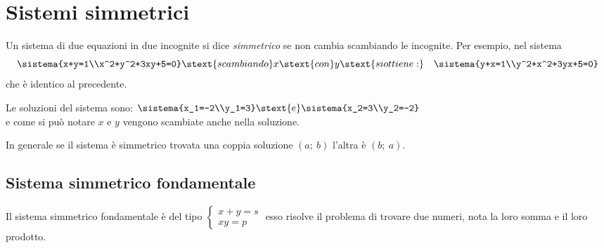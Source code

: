 % 
% 

\section{Sistemi simmetrici}
\label{sec:eq2gr_sistemi_simmetrici}

Un sistema di due equazioni in due incognite si dice \emph{simmetrico} se non 
cambia scambiando le incognite.
Per esempio, nel sistema 
\[\sistema{x+y=1\\x^2+y^2+3xy+5=0}
\stext{ scambiando } x \stext{ con } y \stext{ si ottiene: } \quad 
\sistema{y+x=1\\y^2+x^2+3yx+5=0}\] 
che è identico al precedente.

Le soluzioni del sistema sono:  
\(\sistema{x_1=-2\\y_1=3} \stext{ e } \sistema{x_2=3\\y_2=-2}\) \\
e come si può notare \(x\) e \(y\) vengono scambiate anche nella soluzione.

In generale se il sistema è simmetrico trovata una coppia soluzione \((a;~b)\) 
l'altra è \((b;~a)\).

\subsection{Sistema simmetrico fondamentale}
Il sistema simmetrico fondamentale è del tipo 
\(\left\{\begin{array}{l}{x+y=s}\\{xy=p}\end{array}\right.\) esso risolve il 
problema di trovare due numeri, nota la loro somma e il loro prodotto.

